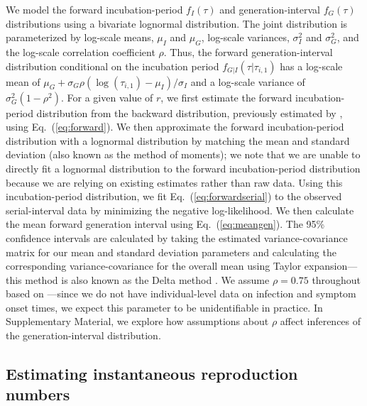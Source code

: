 \documentclass[12pt]{article}
\newcommand{\eref}[1]{Eq.~(\ref{eq:#1})}
\begin{document}
We model the forward incubation-period $f_I(\tau)$ and generation-interval $f_G(\tau)$ distributions using a bivariate lognormal distribution.
The joint distribution is parameterized by log-scale means, $\mu_I$ and $\mu_G$, log-scale variances, $\sigma_I^2$ and $\sigma_G^2$, and the log-scale correlation coefficient $\rho$.
Thus, the forward generation-interval distribution conditional on the incubation period $f_{G|I}(\tau|\tau_{i,1})$ has a log-scale mean of $\mu_G + \sigma_G \rho (\log(\tau_{i, 1}) - \mu_I)/\sigma_I$ and a log-scale variance of $\sigma_G^2 (1 - \rho^2)$.
For a given value of $r$, we first estimate the forward incubation-period distribution from the backward distribution, previously estimated by \cite{backer2021omicron}, using \eref{forward}.
We then approximate the forward incubation-period distribution with a lognormal distribution by matching the mean and standard deviation (also known as the method of moments); we note that we are unable to directly fit a lognormal distribution to the forward incubation-period distribution because we are relying on existing estimates rather than raw data.
Using this incubation-period distribution, we fit \eref{forwardserial} to the observed serial-interval data by minimizing the negative log-likelihood.
We then calculate the mean forward generation interval using \eref{meangen}.
The 95\% confidence intervals are calculated by taking the estimated variance-covariance matrix for our mean and standard deviation parameters and calculating the corresponding variance-covariance for the overall mean using Taylor expansion---this method is also known as the Delta method \citep{oehlert1992note}.
We assume $\rho = 0.75$ throughout based on \cite{sender2021unmitigated}---since we do not have individual-level data on infection and symptom onset times, we expect this parameter to be unidentifiable in practice.
In Supplementary Material, we explore how assumptions about $\rho$ affect inferences of the generation-interval distribution.

\subsection{Estimating instantaneous reproduction numbers}
\end{document}
